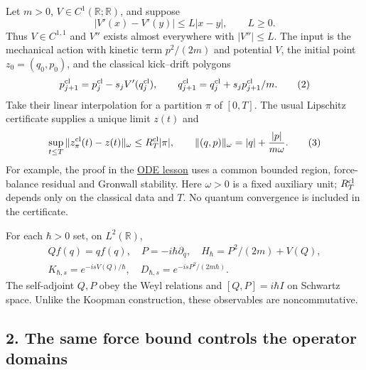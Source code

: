 \documentclass[11pt,a4paper]{article}
\begin{document}
Let \(m>0\), \(V\in C^1(\mathbb R;\mathbb R)\), and suppose
\[|V'(x)-V'(y)|\le L|x-y|,\qquad L\ge0.\tag{1}\] Thus \(V\in C^{1,1}\)
and \(V''\) exists almost everywhere with \(|V''|\le L\). The input is
the mechanical action with kinetic term \(p^2/(2m)\) and potential
\(V\), the initial point \(z_0=(q_0,p_0)\), and the classical
kick--drift polygons \[
 p_{j+1}^{\rm cl}=p_j^{\rm cl}-s_jV'(q_j^{\rm cl}),\qquad
 q_{j+1}^{\rm cl}=q_j^{\rm cl}+s_jp_{j+1}^{\rm cl}/m.\tag{2}
\] Take their linear interpolation for a partition \(\pi\) of \([0,T]\).
The usual Lipschitz certificate supplies a unique limit \(z(t)\) and
\[\sup_{t\le T}\|z_\pi^{\rm cl}(t)-z(t)\|_\omega
 \le R_T^{\rm cl}|\pi|,\qquad
 \|(q,p)\|_\omega=|q|+\frac{|p|}{m\omega}.\tag{3}\] For example, the
proof in the \href{balaban-ode-lesson.md}{ODE lesson} uses a common
bounded region, force-balance residual and Gronwall stability. Here
\(\omega>0\) is a fixed auxiliary unit; \(R_T^{\rm cl}\) depends only on
the classical data and \(T\). No quantum convergence is included in the
certificate.

For each \(\hbar>0\) set, on \(L^2(\mathbb R)\), \[
 \begin{gathered}
 Qf(q)=qf(q),\quad P=-i\hbar\partial_q,\quad
 H_\hbar=P^2/(2m)+V(Q),\\
 K_{\hbar,s}=e^{-isV(Q)/\hbar},\quad
 D_{\hbar,s}=e^{-isP^2/(2m\hbar)}.
 \end{gathered}\tag{4}
\] The self-adjoint \(Q,P\) obey the Weyl relations and
\([Q,P]=i\hbar I\) on Schwartz space. Unlike the Koopman construction,
these observables are noncommutative.

\subsection{2. The same force bound controls the operator
domains}\label{the-same-force-bound-controls-the-operator-domains}
\end{document}
